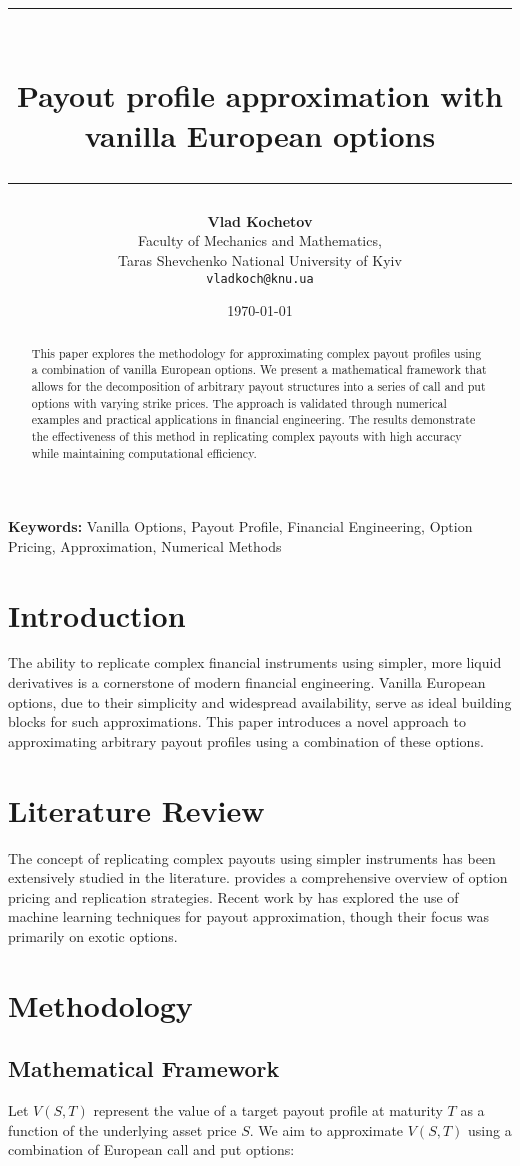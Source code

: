 \documentclass[12pt]{article}
\title{\rule{\textwidth}{2pt}\\[0.5cm]
\textbf{Payout profile approximation with vanilla European options}\\[0.5cm]
\rule{\textwidth}{1pt}}
\author{\small \textbf{Vlad Kochetov} \\
    \small Faculty of Mechanics and Mathematics, \\
    \small Taras Shevchenko National University of Kyiv \\
    \small \texttt{vladkoch@knu.ua}
}
\date{\today}
\providecommand{\keywords}[1]{\textbf{Keywords:} #1}
\begin{document}
\maketitle

\begin{abstract}
This paper explores the methodology for approximating complex payout profiles using a combination of vanilla European options. We present a mathematical framework that allows for the decomposition of arbitrary payout structures into a series of call and put options with varying strike prices. The approach is validated through numerical examples and practical applications in financial engineering. The results demonstrate the effectiveness of this method in replicating complex payouts with high accuracy while maintaining computational efficiency.
\end{abstract}

\keywords{Vanilla Options, 
          Payout Profile, 
          Financial Engineering, 
          Option Pricing, 
          Approximation,
          Numerical Methods}

\section{Introduction}
The ability to replicate complex financial instruments using simpler, more liquid derivatives is a cornerstone of modern financial engineering. Vanilla European options, due to their simplicity and widespread availability, serve as ideal building blocks for such approximations. This paper introduces a novel approach to approximating arbitrary payout profiles using a combination of these options.

\section{Literature Review}
The concept of replicating complex payouts using simpler instruments has been extensively studied in the literature. \cite{hull2018options} provides a comprehensive overview of option pricing and replication strategies. Recent work by \cite{smith2020financial} has explored the use of machine learning techniques for payout approximation, though their focus was primarily on exotic options.

\section{Methodology}
\subsection{Mathematical Framework}
Let \( V(S, T) \) represent the value of a target payout profile at maturity \( T \) as a function of the underlying asset price \( S \). We aim to approximate \( V(S, T) \) using a combination of European call and put options:
\end{document}
